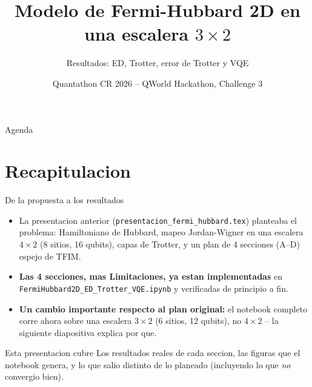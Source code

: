 \documentclass[aspectratio=169,10pt]{beamer}
\title[Fermi-Hubbard 2D: resultados]{Modelo de Fermi-Hubbard 2D en una escalera $3\times2$}
\subtitle{Resultados: ED, Trotter, error de Trotter y VQE}
\author{Quantathon CR 2026 -- QWorld Hackathon, Challenge 3}
\date{}
\newcommand{\good}[1]{\textcolor{qAccent}{\textbf{#1}}}
\newcommand{\warn}[1]{\textcolor{qWarn}{\textbf{#1}}}
\begin{document}
\begin{frame}
  \titlepage
\end{frame}

\begin{frame}{Agenda}
  \tableofcontents
\end{frame}

\section{Recapitulacion}

\begin{frame}{De la propuesta a los resultados}
  \begin{itemize}
    \item La presentacion anterior (\texttt{presentacion\_fermi\_hubbard.tex}) planteaba el
      problema: Hamiltoniano de Hubbard, mapeo Jordan-Wigner en una escalera $4\times2$
      (8 sitios, 16 qubits), capas de Trotter, y un plan de 4 secciones (A--D) espejo de TFIM.
    \item \good{Las 4 secciones, mas Limitaciones, ya estan implementadas} en
      \texttt{FermiHubbard2D\_ED\_Trotter\_VQE.ipynb} y verificadas de principio a fin.
    \item \warn{Un cambio importante respecto al plan original:} el notebook completo corre
      ahora sobre una escalera \textbf{$3\times2$} (6 sitios, 12 qubits), no $4\times2$ --
      la siguiente diapositiva explica por que.
  \end{itemize}
  \vspace{0.5em}
  \begin{block}{Esta presentacion cubre}
    Los resultados reales de cada seccion, las figuras que el notebook genera, y lo que
    salio distinto de lo planeado (incluyendo lo que \emph{no} convergio bien).
  \end{block}
\end{frame}
\end{document}
